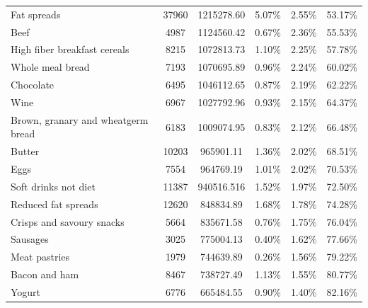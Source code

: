 \documentclass[utf8]{frontiersSCNS}
\begin{document}
\begin{table}[h!]
{\begin{tabular}{lccccc}
        Fat spreads                                         & 37960 & 1215278.60 & 5.07\%        & 2.55\%   & 53.17\%      \\
        Beef                                                & 4987  & 1124560.42 & 0.67\%        & 2.36\%   & 55.53\%      \\
        High fiber breakfast cereals                        & 8215  & 1072813.73 & 1.10\%        & 2.25\%   & 57.78\%      \\
        Whole meal bread                                    & 7193  & 1070695.89 & 0.96\%        & 2.24\%   & 60.02\%      \\
        Chocolate                                           & 6495  & 1046112.65 & 0.87\%        & 2.19\%   & 62.22\%      \\
        Wine                                                & 6967  & 1027792.96 & 0.93\%        & 2.15\%   & 64.37\%      \\
        Brown, granary and wheatgerm bread                  & 6183  & 1009074.95 & 0.83\%        & 2.12\%   & 66.48\%      \\
        Butter                                              & 10203 & 965901.11  & 1.36\%        & 2.02\%   & 68.51\%      \\
        Eggs                                                & 7554  & 964769.19  & 1.01\%        & 2.02\%   & 70.53\%      \\
        Soft drinks not diet                                & 11387 & 940516.516 & 1.52\%        & 1.97\%   & 72.50\%      \\
        Reduced fat spreads                                 & 12620 & 848834.89  & 1.68\%        & 1.78\%   & 74.28\%      \\
        Crisps and savoury snacks                           & 5664  & 835671.58  & 0.76\%        & 1.75\%   & 76.04\%      \\
        Sausages                                            & 3025  & 775004.13  & 0.40\%        & 1.62\%   & 77.66\%      \\
        Meat pastries                                       & 1979  & 744639.89  & 0.26\%        & 1.56\%   & 79.22\%      \\
        Bacon and ham                                       & 8467  & 738727.49  & 1.13\%        & 1.55\%   & 80.77\%      \\
        Yogurt                                              & 6776  & 665484.55  & 0.90\%        & 1.40\%   & 82.16\%      \\

\end{tabular}}
\end{table}
\end{document}
